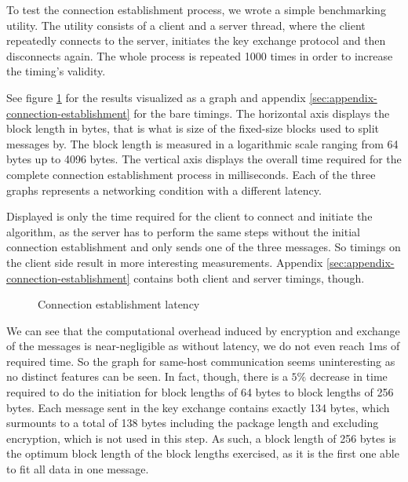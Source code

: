 To test the connection establishment process, we wrote a simple benchmarking utility.
The utility consists of a client and a server thread, where the client repeatedly connects to the server, initiates the key exchange protocol and then disconnects again.
The whole process is repeated 1000 times in order to increase the timing's validity.

See figure \ref{fig:connection-establishment} for the results visualized as a graph and appendix \ref{sec:appendix-connection-establishment} for the bare timings.
The horizontal axis displays the block length in bytes, that is what is size of the fixed-size blocks used to split messages by.
The block length is measured in a logarithmic scale ranging from 64 bytes up to 4096 bytes.
The vertical axis displays the overall time required for the complete connection establishment process in milliseconds.
Each of the three graphs represents a networking condition with a different latency.

Displayed is only the time required for the client to connect and initiate the algorithm, as the server has to perform the same steps without the initial connection establishment and only sends one of the three messages.
So timings on the client side result in more interesting measurements.
Appendix \ref{sec:appendix-connection-establishment} contains both client and server timings, though.

\begin{figure}[t]
    \centering
    \caption{Connection establishment latency}
    \label{fig:connection-establishment}
\end{figure}

We can see that the computational overhead induced by encryption and exchange of the messages is near-negligible as without latency, we do not even reach 1ms of required time.
So the graph for same-host communication seems uninteresting as no distinct features can be seen.
In fact, though, there is a $5\%$ decrease in time required to do the initiation for block lengths of 64 bytes to block lengths of 256 bytes.
Each message sent in the key exchange contains exactly 134 bytes, which surmounts to a total of 138 bytes including the package length and excluding encryption, which is not used in this step.
As such, a block length of 256 bytes is the optimum block length of the block lengths exercised, as it is the first one able to fit all data in one message.

